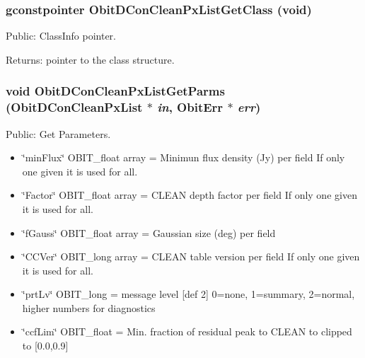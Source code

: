 \subsubsection{\setlength{\rightskip}{0pt plus 5cm}gconstpointer Obit\-DCon\-Clean\-Px\-List\-Get\-Class (void)}\label{ObitDConCleanPxList_8c_a11}


Public: Class\-Info pointer. 

\begin{Desc}
\item[Returns:]pointer to the class structure. \end{Desc}
\subsubsection{\setlength{\rightskip}{0pt plus 5cm}void Obit\-DCon\-Clean\-Px\-List\-Get\-Parms ({\bf Obit\-DCon\-Clean\-Px\-List} $\ast$ {\em in}, {\bf Obit\-Err} $\ast$ {\em err})}\label{ObitDConCleanPxList_8c_a15}


Public: Get Parameters. 

\begin{itemize}
\item \char`\"{}min\-Flux\char`\"{} OBIT\_\-float array = Minimun flux density (Jy) per field If only one given it is used for all. \item \char`\"{}Factor\char`\"{} OBIT\_\-float array = CLEAN depth factor per field If only one given it is used for all. \item \char`\"{}f\-Gauss\char`\"{} OBIT\_\-float array = Gaussian size (deg) per field \item \char`\"{}CCVer\char`\"{} OBIT\_\-long array = CLEAN table version per field If only one given it is used for all. \item \char`\"{}prt\-Lv\char`\"{} OBIT\_\-long = message level [def 2] 0=none, 1=summary, 2=normal, higher numbers for diagnostics \item \char`\"{}ccf\-Lim\char`\"{} OBIT\_\-float = Min. fraction of residual peak to CLEAN to clipped to [0.0,0.9] 
\end{itemize}
